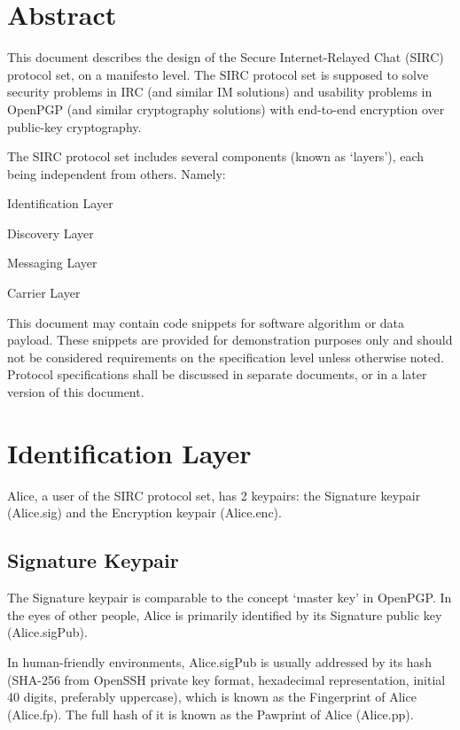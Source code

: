 \documentclass[a4paper,11pt]{article}
\begin{document}
\fulldoctitle


\section*{Abstract}

This document describes the design of the Secure Internet-Relayed Chat (SIRC) protocol set, on a manifesto level.
The SIRC protocol set is supposed to solve security problems in IRC (and similar IM solutions)
and usability problems in OpenPGP (and similar cryptography solutions)
with end-to-end encryption over public-key cryptography.

The SIRC protocol set includes several components (known as `layers'), each being independent from others. Namely:

\begin{compactitem}
	\item Identification Layer
	\item Discovery Layer
	\item Messaging Layer
	\item Carrier Layer
\end{compactitem}

This document may contain code snippets for software algorithm or data payload.
These snippets are provided for demonstration purposes only and should not be considered requirements on the specification level unless otherwise noted.
Protocol specifications shall be discussed in separate documents, or in a later version of this document.

\clearpage
\tableofcontents


\section{Identification Layer}

Alice, a user of the SIRC protocol set, has 2 keypairs: the Signature keypair (Alice.sig) and the Encryption keypair (Alice.enc).

\subsection{Signature Keypair}
The Signature keypair is comparable to the concept `master key' in OpenPGP.
In the eyes of other people, Alice is primarily identified by its Signature public key (Alice.sigPub).

In human-friendly environments, Alice.sigPub is usually addressed by its hash
(SHA-256 from OpenSSH private key format, hexadecimal representation, initial 40 digits, preferably uppercase),
which is known as the Fingerprint of Alice (Alice.fp).
The full hash of it is known as the Pawprint of Alice (Alice.pp).
\end{document}
